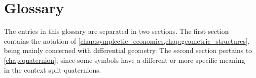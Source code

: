 %
\chapter{Glossary} %
%
%



%

The entries in this glossary are separated in two sections. The first section contains the notation of \cref{chap:symplectic_economics,chap:geometric_structures}, being mainly concerned with differential geometry. The second section pertains to \cref{chap:quaternion}, since some symbols have a different or more specific meaning in the context split-quaternions. 



